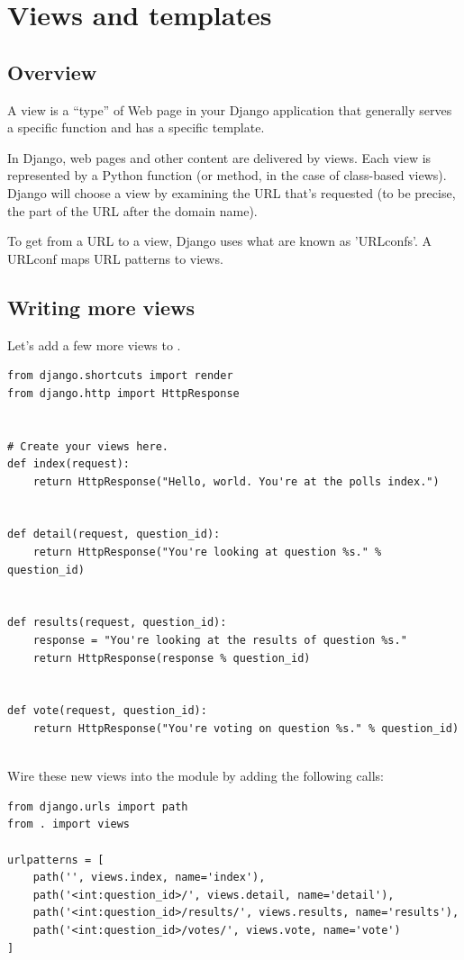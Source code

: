 
\chapter{Views and templates}

\section{Overview}

A view is a ``type'' of Web page in your Django application that generally serves a specific function and has a specific template. 

In Django, web pages and other content are delivered by views.
Each view is represented by a Python function (or method, in the case of class-based views).
Django will choose a view by examining the URL that’s requested (to be precise, the part of the URL after the domain name).

To get from a URL to a view, Django uses what are known as 'URLconfs'.
A URLconf maps URL patterns to views.


\section{Writing more views}

Let's add a few more views to .
\lstset{language=Python}
\begin{lstlisting}
from django.shortcuts import render
from django.http import HttpResponse


# Create your views here.
def index(request):
    return HttpResponse("Hello, world. You're at the polls index.")


def detail(request, question_id):
    return HttpResponse("You're looking at question %s." % question_id)


def results(request, question_id):
    response = "You're looking at the results of question %s."
    return HttpResponse(response % question_id)


def vote(request, question_id):
    return HttpResponse("You're voting on question %s." % question_id)
  
\end{lstlisting}


Wire these new views into the  module by adding the following  calls:
\begin{lstlisting}
from django.urls import path
from . import views

urlpatterns = [
    path('', views.index, name='index'),
    path('<int:question_id>/', views.detail, name='detail'),
    path('<int:question_id>/results/', views.results, name='results'),
    path('<int:question_id>/votes/', views.vote, name='vote')
]
\end{lstlisting}


